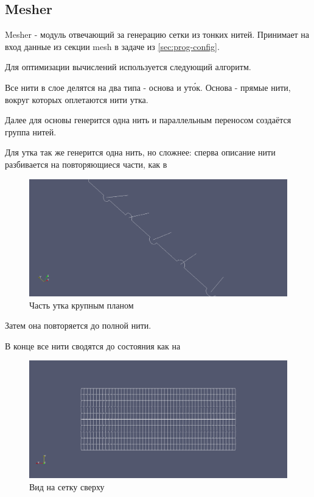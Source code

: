\subsection{Mesher}\label{sec:prog-mesher}
Mesher - модуль отвечающий за генерацию сетки из тонких нитей.
Принимает на вход данные из секции mesh в задаче из \ref{sec:prog-config}.

Для оптимизации вычислений используется следующий алгоритм.

Все нити в слое делятся на два типа - основа и ут\'{о}к. Основа - прямые нити, вокруг которых оплетаются нити утка.

Далее для основы генерится одна нить и параллельным переносом создаётся группа нитей.

Для утка так же генерится одна нить, но сложнее: сперва описание нити разбивается на повторяющиеся части, как в

\begin{figure}[H]
    \centering
    \includegraphics[width=1.0\textwidth]{img/weft_fiber.png}
    \caption{Часть утка крупным планом}
    \label{fig:weft-fiber}
\end{figure}

Затем она повторяется до полной нити.

В конце все нити сводятся до состояния как на 
\begin{figure}[H]
    \centering
    \includegraphics[width=1.0\textwidth]{img/scheme.png}
    \caption{Вид на сетку сверху}
    \label{fig:scheme}
\end{figure}

